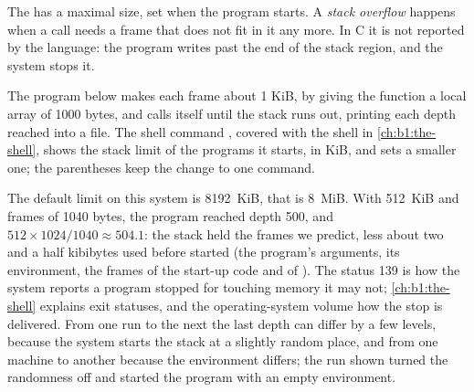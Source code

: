 \begin{definition}\label{def:b1:c-functions-and-stack:stack-overflow}
The  has a maximal size, set when the program starts. A \emph{stack overflow}
happens when a call needs a frame that does not fit in it any more. In C it is not reported by the language: the
program writes past the end of the stack region, and the system stops it.
\end{definition}

The program below makes each frame about 1 KiB, by giving the function a local array of 1000 bytes, and calls
itself until the stack runs out, printing each depth reached into a file. The shell command ,
covered with the shell in \cref{ch:b1:the-shell}, shows the stack limit of the programs it starts, in KiB, and
sets a smaller one; the parentheses keep the change to one command.

\label{lst:b1:c-functions-and-stack:deep}

\label{out:b1:c-functions-and-stack:depth}

The default limit on this system is 8192~KiB, that is 8~MiB. With 512~KiB and frames of 1040 bytes, the program
reached depth 500, and $512 \times 1024 / 1040 \approx 504.1$: the stack held the frames we predict, less about
two and a half kibibytes used before  started (the program's arguments, its environment, the frames of
the start-up code and of ). The status 139 is how the system reports a program stopped for touching memory it may
not; \cref{ch:b1:the-shell} explains exit statuses, and the operating-system volume how the stop is delivered.
From one run to the next the last depth can differ by a few levels, because the system starts the stack at a
slightly random place, and from one machine to another because the environment differs; the run shown turned the
randomness off and started the program with an empty environment.

